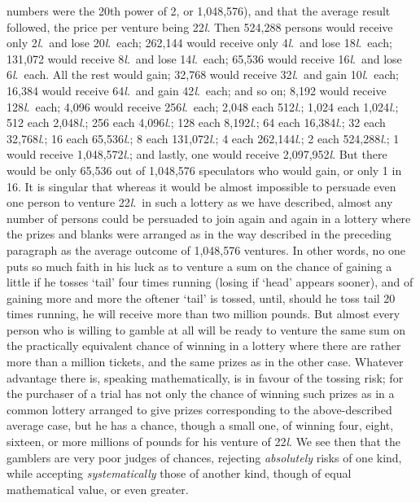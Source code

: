 \documentclass[letterpaper,12pt,oneside,openany]{memoir}
\begin{document}
numbers were the 20th power of 2, or 1,048,576), and
that the average result followed, the price per venture
being 22\textit{l}. Then 524,288 persons would receive only
2\textit{l}.\ and lose 20\textit{l}.\ each; 262,144 would receive only 4\textit{l}.\ and
lose 18\textit{l}.\ each; 131,072 would receive 8\textit{l}.\ and lose
14\textit{l}.\ each; 65,536 would receive 16\textit{l}.\ and lose 6\textit{l}.\ each.
All the rest would gain; 32,768 would receive 32\textit{l}.\ and
gain 10\textit{l}.\ each; 16,384 would receive 64\textit{l}.\ and gain 42\textit{l}.\ each;
and so on; 8,192 would receive 128\textit{l}.\ each;
4,096 would receive 256\textit{l}.\ each; 2,048 each 512\textit{l}.;
1,024 each 1,024\textit{l}.; 512 each 2,048\textit{l}.; 256 each 4,096\textit{l}.;
128 each 8,192\textit{l}.; 64 each 16,384\textit{l}.; 32 each 32,768\textit{l}.;
16 each 65,536\textit{l}.; 8 each 131,072\textit{l}.; 4 each 262,144\textit{l}.;
2 each 524,288\textit{l}.; 1 would receive 1,048,572\textit{l}.; and
lastly, one would receive 2,097,952\textit{l}. But there would
be only 65,536 out of 1,048,576 speculators who would
gain, or only 1 in 16.
It is singular that whereas it would be almost impossible
to persuade even one person to venture 22\textit{l}.\ in
such a lottery as we have described, almost any number
of persons could be persuaded to join again and again
in a lottery where the prizes and blanks were arranged
as in the way described in the preceding paragraph as
the average outcome of 1,048,576 ventures. In other
words, no one puts so much faith in his luck as to venture
a sum on the chance of gaining a little if he tosses
`tail' four times running (losing if `head' appears
sooner), and of gaining more and more the oftener
`tail' is tossed, until, should he toss tail 20 times running,
he will receive more than two million pounds.
But almost every person who is willing to gamble at all
will be ready to venture the same sum on the practically
equivalent chance of winning in a lottery where there
are rather more than a million tickets, and the same
prizes as in the other case. Whatever advantage there
is, speaking mathematically, is in favour of the tossing
risk; for the purchaser of a trial has not only the chance
of winning such prizes as in a common lottery arranged
to give prizes corresponding to the above-described
average case, but he has a chance, though a small one,
of winning four, eight, sixteen, or more millions of
pounds for his venture of 22\textit{l}. We see then that the
gamblers are very poor judges of chances, rejecting \textit{absolutely}
risks of one kind, while accepting \textit{systematically}
those of another kind, though of equal mathematical
value, or even greater.
\end{document}
